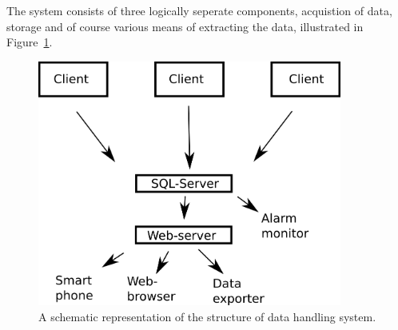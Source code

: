 The system consists of three logically seperate components, acquistion of data,
storage and of course various means of extracting the data, illustrated in
Figure~\ref{fig:system_overview}.

\begin{figure}
 \begin{center}
 \includegraphics[width=10cm]{system_overview.png}
 \caption{
   A schematic representation of the structure of data handling system.
   \label{fig:system_overview}
 } 
 \end{center}
\end{figure}
